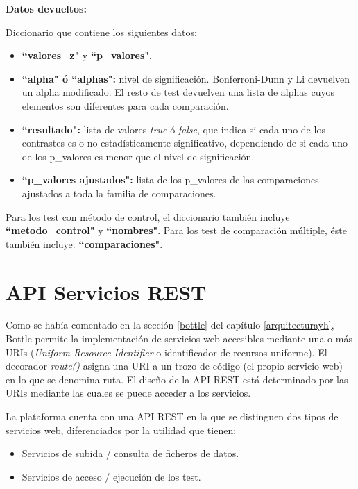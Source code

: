 \noindent
\textbf{Datos devueltos:}

Diccionario que contiene los siguientes datos:                                              

\begin{itemize}
\item \textbf{``valores\_z"} y \textbf{``p\_valores"}.
\item \textbf{``alpha" \space ó ``alphas":} nivel de significación. Bonferroni-Dunn y Li devuelven un alpha modificado. El resto de test devuelven una lista de alphas cuyos elementos son diferentes para cada comparación.
\item \textbf{``resultado":} lista de valores \textit{true} ó \textit{false}, que indica si cada uno de los contrastes es o no estadísticamente significativo, dependiendo de si cada uno de los p\_valores es menor que el nivel de significación.
\item \textbf{``p\_valores ajustados":} lista de los p\_valores de las comparaciones ajustados a toda la familia de comparaciones.
\end{itemize}

Para los test con método de control, el diccionario también incluye \textbf{``metodo\_control"} y \textbf{``nombres"}. Para los test de comparación múltiple, éste también incluye: \textbf{``comparaciones"}.

\section{API Servicios REST} \label{dis_api}
Como se había comentado en la sección \ref{bottle} del capítulo \ref{arquitecturayh}, Bottle permite la implementación de servicios web accesibles mediante una o más URIs (\textit{Uniform Resource Identifier} o identificador de recursos uniforme). El decorador \textit{route()} asigna una URI a un trozo de código (el propio servicio web) en lo que se denomina ruta. El diseño de la API REST está determinado por las URIs mediante las cuales se puede acceder a los servicios.

La plataforma cuenta con una API REST en la que se distinguen dos tipos de servicios web, diferenciados por la utilidad que tienen:
\begin{itemize}
\item Servicios de subida / consulta de ficheros de datos.
\item Servicios de acceso / ejecución de los test.
\end{itemize}

